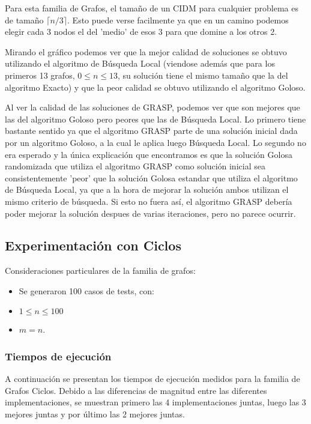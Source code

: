Para esta familia de Grafos, el tamaño de un CIDM para cualquier problema es de tamaño $\lceil n/3 \rceil$. Esto puede verse facilmente ya que en un camino podemos elegir cada 3 nodos el del 'medio' de esos 3 para que domine a los otros 2.

Mirando el gráfico podemos ver que la mejor calidad de soluciones se obtuvo utilizando el algoritmo de Búsqueda Local (viendose además que para los primeros 13 grafos, $0 \leq n \leq 13$, su solución tiene el mismo tamaño que la del algoritmo Exacto) y que la peor calidad se obtuvo utilizando el algoritmo Goloso.

Al ver la calidad de las soluciones de GRASP, podemos ver que son mejores que las del algoritmo Goloso pero peores que las de Búsqueda Local. Lo primero tiene bastante sentido ya que el algoritmo GRASP parte de una solución inicial dada por un algoritmo Goloso, a la cual le aplica luego Búsqueda Local. Lo segundo no era esperado y la única explicación que encontramos es que la solución Golosa randomizada que utiliza el algoritmo GRASP como solución inicial sea consistentemente 'peor' que la solución Golosa estandar que utiliza el algoritmo de Búsqueda Local, ya que a la hora de mejorar la solución ambos utilizan el mismo criterio de búsqueda. Si esto no fuera así, el algoritmo GRASP debería poder mejorar la solución despues de varias iteraciones, pero no parece ocurrir.

\subsection{Experimentación con Ciclos}

Consideraciones particulares de la familia de grafos:
\begin{itemize}
    \item Se generaron 100 casos de tests, con:
    \item $1 \leq n \leq 100$
    \item $m = n$.
\end{itemize}

\subsubsection{Tiempos de ejecución}

A continuación se presentan los tiempos de ejecución medidos para la familia de Grafos Ciclos. Debido a las diferencias de magnitud entre las diferentes implementaciones, se muestran primero las 4 implementaciones juntas, luego las 3 mejores juntas y por último las 2 mejores juntas.

